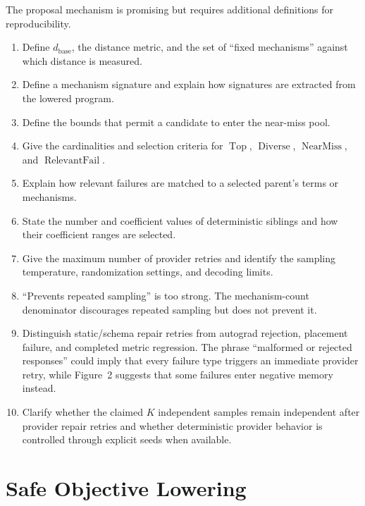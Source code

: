 \documentclass[11pt]{article}
\begin{document}
The proposal mechanism is promising but requires additional definitions for
reproducibility.

\begin{enumerate}
  \item Define $d_{\mathrm{base}}$, the distance metric, and the set of ``fixed
  mechanisms'' against which distance is measured.

  \item Define a mechanism signature and explain how signatures are extracted
  from the lowered program.

  \item Define the bounds that permit a candidate to enter the near-miss pool.

  \item Give the cardinalities and selection criteria for
  $\operatorname{Top}$, $\operatorname{Diverse}$,
  $\operatorname{NearMiss}$, and $\operatorname{RelevantFail}$.

  \item Explain how relevant failures are matched to a selected parent's terms
  or mechanisms.

  \item State the number and coefficient values of deterministic siblings and
  how their coefficient ranges are selected.

  \item Give the maximum number of provider retries and identify the sampling
  temperature, randomization settings, and decoding limits.

  \item ``Prevents repeated sampling'' is too strong. The mechanism-count
  denominator discourages repeated sampling but does not prevent it.

  \item Distinguish static/schema repair retries from autograd rejection,
  placement failure, and completed metric regression. The phrase ``malformed
  or rejected responses'' could imply that every failure type triggers an
  immediate provider retry, while Figure~2 suggests that some failures enter
  negative memory instead.

  \item Clarify whether the claimed $K$ independent samples remain independent
  after provider repair retries and whether deterministic provider behavior is
  controlled through explicit seeds when available.
\end{enumerate}

\section{Safe Objective Lowering}
\end{document}
